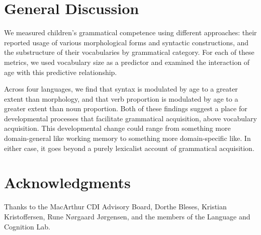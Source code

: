 \documentclass[10pt,letterpaper]{article}
\begin{document}
\section{General Discussion}

We measured children's grammatical competence using different approaches: their reported usage of various morphological forms and syntactic constructions, and the substructure of their vocabularies by grammatical category. For each of these metrics, we used vocabulary size as a predictor and examined the interaction of age with this predictive relationship.

Across four languages, we find that syntax is modulated by age to a greater extent than morphology, and that verb proportion is modulated by age to a greater extent than noun proportion. Both of these findings suggest a place for developmental processes that facilitate grammatical acquisition, above vocabulary acquisition. This developmental change could range from something more domain-general like working memory to something more domain-specific like. In either case, it goes beyond a purely lexicalist account of grammatical acquisition.

\section{Acknowledgments}

Thanks to the MacArthur CDI Advisory Board, Dorthe Bleses, Kristian Kristoffersen, Rune N\o rgaard J\o rgensen, and the members of the Language and Cognition Lab. 



\setlength{\bibleftmargin}{.125in}
\setlength{\bibindent}{-\bibleftmargin}


\end{document}
